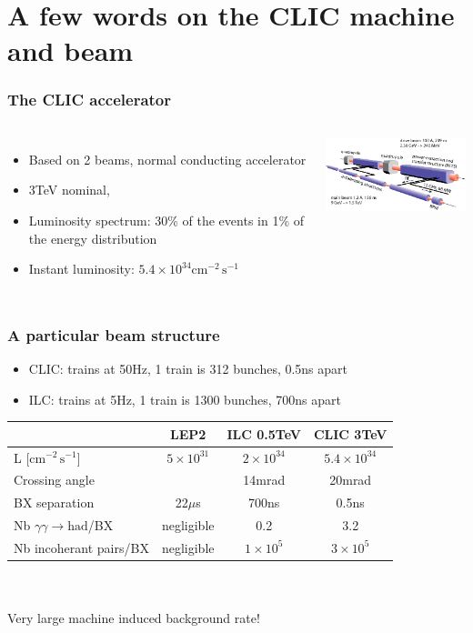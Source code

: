 \documentclass{beamer}
\begin{document}
\section[CLIC]{A few words on the CLIC machine and beam} 
\begin{frame}
\frametitle{The CLIC accelerator}
\begin{columns}[c]
\column{6cm}
\begin{itemize}
  \item Based on 2 beams, normal conducting accelerator
  \item 3TeV nominal, 
  \item Luminosity spectrum: 30\% of the events in 1\% of the energy
  distribution
  \item Instant luminosity: $5.4\times
  10^{34}\textrm{cm}^{-2}\,\textrm{s}^{-1}$
\end{itemize}
\column{6cm}
\includegraphics[width=6cm]{accel}
\end{columns}
\end{frame}

\begin{frame}
\frametitle{A particular beam structure}
\begin{itemize}
  \item CLIC: trains at 50Hz, 1 train is 312 bunches, 0.5ns apart
  \item ILC: trains at 5Hz, 1 train is 1300 bunches, 700ns apart
\end{itemize}
\centering
\begin{tabular}{lccc}
 & LEP2 & ILC 0.5TeV & CLIC 3TeV\\
 \hline
L [$\textrm{cm}^{-2}\,\textrm{s}^{-1}$] & $5\times 10^{31}$ & $2\times 10^{34}$& $5.4\times 10^{34}$ \\ 
\hline
Crossing angle & ~ & 14mrad & 20mrad\\
\hline
BX separation & 22$\mu$s & 700ns & \alert{0.5ns}\\
\hline
Nb $\gamma\gamma\to\textrm{had}$/BX & negligible & 0.2 & \alert{3.2}\\
\hline
Nb incoherant pairs/BX & negligible & $1\times 10^5$ & \alert{$3\times10^5$}\\
\hline
\end{tabular}
~\\
~\\
\alert{Very large machine induced background rate!}
\end{frame}
\end{document}
